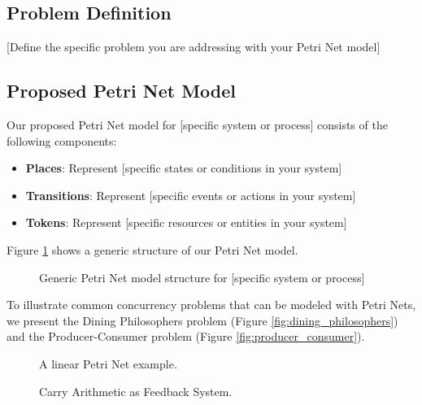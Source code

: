 \subsection{Problem Definition}

[Define the specific problem you are addressing with your Petri Net model]

\subsection{Proposed Petri Net Model}

Our proposed Petri Net model for [specific system or process] consists of the following components:

\begin{itemize}
    \item \textbf{Places}: Represent [specific states or conditions in your system]
    \item \textbf{Transitions}: Represent [specific events or actions in your system]
    \item \textbf{Tokens}: Represent [specific resources or entities in your system]
\end{itemize}

Figure \ref{fig:petri_net_generic_model} shows a generic structure of our Petri Net model.
\begin{figure}[htbp]
\centering

\caption{Generic Petri Net model structure for [specific system or process]}
\label{fig:petri_net_generic_model} %
\end{figure}

To illustrate common concurrency problems that can be modeled with Petri Nets, we present the Dining Philosophers problem (Figure \ref{fig:dining_philosophers}) and the Producer-Consumer problem (Figure \ref{fig:producer_consumer}).

\begin{figure*}[htbp]
\centering

\caption{Petri Net model of the Dining Philosophers problem}
\label{fig:dining_philosophers}
\end{figure*}

\begin{figure}[htbp]
\centering
\resizebox{0.95\columnwidth}{!}{}
\caption{A linear Petri Net example.}
\label{fig:linear_petri_net}
\end{figure}

\begin{figure}[htbp]
\centering

\caption{Carry Arithmetic as Feedback System.}
\label{fig:carry_arithmetic_feedback}
\end{figure}

